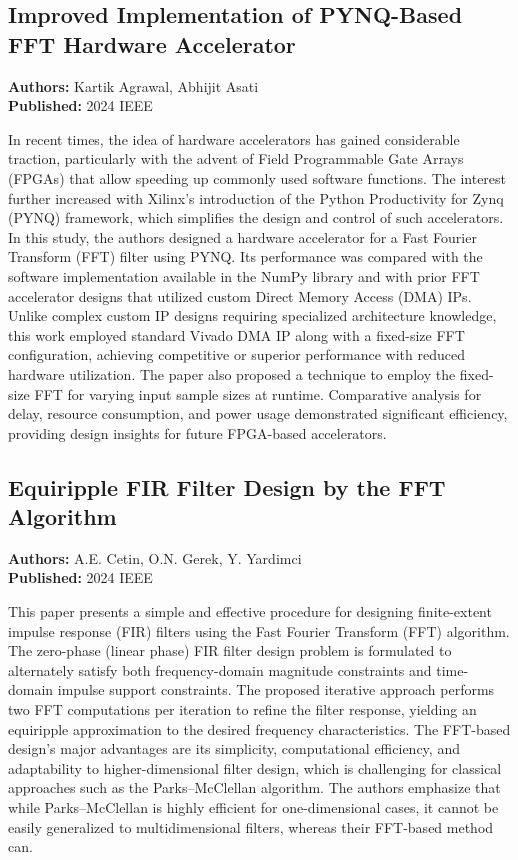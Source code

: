 \documentclass[conference]{IEEEtran}
\begin{document}
	\subsection{Improved Implementation of PYNQ-Based FFT Hardware Accelerator}
	\textbf{Authors:} Kartik Agrawal, Abhijit Asati \\
	\textbf{Published:} 2024 IEEE
	
	\noindent In recent times, the idea of hardware accelerators has gained considerable traction, particularly with the advent of Field Programmable Gate Arrays (FPGAs) that allow speeding up commonly used software functions. The interest further increased with Xilinx’s introduction of the Python Productivity for Zynq (PYNQ) framework, which simplifies the design and control of such accelerators. In this study, the authors designed a hardware accelerator for a Fast Fourier Transform (FFT) filter using PYNQ. Its performance was compared with the software implementation available in the NumPy library and with prior FFT accelerator designs that utilized custom Direct Memory Access (DMA) IPs. 
	Unlike complex custom IP designs requiring specialized architecture knowledge, this work employed standard Vivado DMA IP along with a fixed-size FFT configuration, achieving competitive or superior performance with reduced hardware utilization. The paper also proposed a technique to employ the fixed-size FFT for varying input sample sizes at runtime. Comparative analysis for delay, resource consumption, and power usage demonstrated significant efficiency, providing design insights for future FPGA-based accelerators.
	
	\subsection{Equiripple FIR Filter Design by the FFT Algorithm}
	\textbf{Authors:} A.E. Cetin, O.N. Gerek, Y. Yardimci \\
	\textbf{Published:} 2024 IEEE
	
	\noindent This paper presents a simple and effective procedure for designing finite-extent impulse response (FIR) filters using the Fast Fourier Transform (FFT) algorithm. The zero-phase (linear phase) FIR filter design problem is formulated to alternately satisfy both frequency-domain magnitude constraints and time-domain impulse support constraints. The proposed iterative approach performs two FFT computations per iteration to refine the filter response, yielding an equiripple approximation to the desired frequency characteristics. The FFT-based design’s major advantages are its simplicity, computational efficiency, and adaptability to higher-dimensional filter design, which is challenging for classical approaches such as the Parks–McClellan algorithm. The authors emphasize that while Parks–McClellan is highly efficient for one-dimensional cases, it cannot be easily generalized to multidimensional filters, whereas their FFT-based method can.
	
\end{document}
